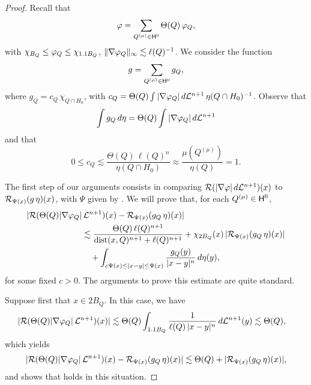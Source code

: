 \begin{proof}
Recall that 
$${\varphi} = \sum_{Q^{(\mu)}\in{\mathsf{H}}^0} \Theta(Q)\,{\varphi}_Q,$$
with $\chi_{B_Q}\leq {\varphi}_Q\leq \chi_{1.1B_Q}$, $\|\nabla{\varphi}_Q\|_\infty\lesssim\ell(Q)^{-1}$.
We consider the function
$$g= \sum_{Q^{(\mu)}\in{\mathsf{H}}^0} g_Q,$$
where $g_Q = c_Q\,\chi_{Q\cap H_0}$, with $c_Q=\Theta(Q)\int|\nabla{\varphi}_Q|\,d{\mathcal L}^{n+1}\,\eta(Q\cap H_0)^{-1}$.
Observe that
\begin{equation}\label{eq:gQintegral}
\int g_Q\,d\eta = \Theta(Q) \int|\nabla{\varphi}_Q|\,d{\mathcal L}^{n+1}
\end{equation}
and that
$$0\leq c_Q \lesssim \frac{\Theta(Q) \,\ell(Q)^n}{\eta(Q\cap H_0)}\approx \frac{\mu(Q^{(\mu)})}{\eta(Q)} =1.$$


The first step of our arguments consists in comparing ${\mathcal R}(|\nabla{\varphi}|\,d{\mathcal L}^{n+1})(x)$ to 
${\mathcal R}_{\Psi(x)}(g\,\eta)(x)$, with $\Psi$ given by .
 We will prove that, for each $Q^{(\mu)}\in {\mathsf{H}}^0$,
 \begin{align}\label{eqtech4}
|{\mathcal R}(\Theta(Q)|\nabla{\varphi}_Q|&\,{\mathcal L}^{n+1})(x) - {\mathcal R}_{\Psi(x)}(g_Q\,\eta)(x)|\\
& \lesssim \frac{\Theta(Q)\,\ell(Q)^{n+1}}{{\rm dist}(x,Q)^{n+1}+
\ell(Q)^{n+1}} + \chi_{2B_Q}(x)\, |{\mathcal R}_{\Psi(x)}(g_Q\,\eta)(x)|\nonumber \\
&\quad+ \int_{c\Psi(x)\leq |x-y|\leq\Psi(x)} \frac{g_Q(y)}{|x-y|^{n}}\,d\eta(y),\nonumber
\end{align}
for some fixed $c>0$.
 The arguments to prove this estimate are quite standard.
 
 Suppose first that $x\in 2B_Q$. In this case, we have
 \begin{align*}
|{\mathcal R}(\Theta(Q)|\nabla{\varphi}_Q|\,{\mathcal L}^{n+1})(x)| &\lesssim \Theta(Q)\int_{1.1B_Q} \frac{1}{\ell(Q)\,|x-y|^n}\,d{\mathcal L}^{n+1}(y) \lesssim \Theta(Q),
\end{align*}
which yields
$$|{\mathcal R}(\Theta(Q)|\nabla{\varphi}_Q|\,{\mathcal L}^{n+1})(x) - {\mathcal R}_{\Psi(x)}(g_Q\,\eta)(x)|
 \lesssim \Theta(Q) + |{\mathcal R}_{\Psi(x)}(g_Q\,\eta)(x)|,$$
 and shows that  holds in this situation.
 

\end{proof}
